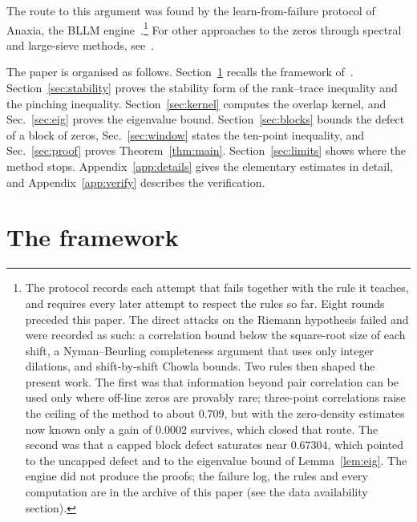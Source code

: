 \documentclass[aps,prd,twocolumn,superscriptaddress,nofootinbib,longbibliography,floatfix,showkeys,amsmath,amssymb,10pt]{revtex4-2}
\theoremstyle{definition}
\theoremstyle{remark}
\begin{document}
The route to this argument was found by the learn-from-failure protocol of
Anaxia, the BLLM engine~\cite{Ana26,BB26c}.\footnote{The protocol records
each attempt that fails together with the rule it teaches, and requires
every later attempt to respect the rules so far. Eight rounds preceded this
paper. The direct attacks on the Riemann hypothesis failed and were recorded
as such: a correlation bound below the square-root size of each shift, a
Nyman--Beurling completeness argument that uses only integer dilations, and
shift-by-shift Chowla bounds. Two rules then shaped the present work. The
first was that information beyond pair correlation can be used only where
off-line zeros are provably rare; three-point correlations raise the ceiling
of the method to about $0.709$, but with the zero-density estimates now
known only a gain of $0.0002$ survives, which closed that route. The second
was that a capped block defect saturates near $0.67304$, which pointed to the
uncapped defect and to the eigenvalue bound of Lemma~\ref{lem:eig}. The
engine did not produce the proofs; the failure log, the rules and every
computation are in the archive of this paper (see the data availability
section).} For other approaches to the zeros through spectral and
large-sieve methods, see~\cite{BNFS26,BB26a}.

The paper is organised as follows. Section~\ref{sec:framework} recalls the
framework of~\cite{AF26}. Section~\ref{sec:stability} proves the stability
form of the rank--trace inequality and the pinching inequality.
Section~\ref{sec:kernel} computes the overlap kernel, and
Sec.~\ref{sec:eig} proves the eigenvalue bound. Section~\ref{sec:blocks}
bounds the defect of a block of zeros, Sec.~\ref{sec:window} states the
ten-point inequality, and Sec.~\ref{sec:proof} proves
Theorem~\ref{thm:main}. Section~\ref{sec:limits} shows where the method
stops. Appendix~\ref{app:details} gives the elementary estimates in detail,
and Appendix~\ref{app:verify} describes the verification.

\section{The framework}\label{sec:framework}
\end{document}
